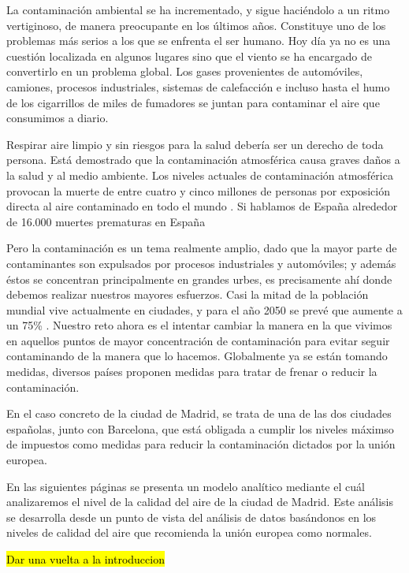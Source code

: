
La contaminación ambiental se ha incrementado, y sigue haciéndolo a un ritmo vertiginoso, de manera preocupante en los últimos años. Constituye uno de los problemas más serios a los que se enfrenta el ser humano. Hoy día ya no es una cuestión localizada en algunos lugares sino que el viento se ha encargado de convertirlo en un problema global. Los gases provenientes de automóviles, camiones, procesos industriales, sistemas de calefacción e incluso hasta el humo de los cigarrillos de miles de fumadores se juntan para contaminar el aire que consumimos a diario. 

Respirar aire limpio y sin riesgos para la salud debería ser un derecho de toda persona. Está demostrado que la contaminación atmosférica causa graves daños a la salud y al medio ambiente. Los niveles actuales de contaminación atmosférica provocan la muerte de entre cuatro y cinco millones de personas por exposición directa al aire contaminado en todo el mundo \cite{sharma_anirudh_anirudh_2018}. Si hablamos de España alrededor de 16.000 muertes prematuras en España \cite{informe_EeA_2019}

Pero la contaminación es un tema realmente amplio, dado que la mayor parte de contaminantes son expulsados por procesos industriales y automóviles; y además éstos se concentran principalmente en grandes urbes, es precisamente ahí donde debemos realizar nuestros mayores esfuerzos. Casi la mitad de la población mundial vive actualmente en ciudades, y para el año 2050 se prevé que aumente a un 75\% \cite{bbc_ciudades}. Nuestro reto ahora es el intentar cambiar la manera en la que vivimos en aquellos puntos de mayor concentración de contaminación para evitar seguir contaminando de la manera que lo hacemos. Globalmente ya se están tomando medidas, diversos países proponen medidas para tratar de frenar o reducir la contaminación. 

En el caso concreto de la ciudad de Madrid, se trata de una de las dos ciudades españolas, junto con Barcelona, que está obligada a cumplir los niveles máximso de  impuestos como medidas para reducir la contaminación dictados por la unión europea.

En las siguientes páginas se presenta un modelo analítico mediante el cuál analizaremos el nivel de la calidad del aire de la ciudad de Madrid. Este análisis se desarrolla desde un punto de vista del análisis de datos basándonos en los niveles de calidad del aire que recomienda la unión europea como normales.

 \hl{Dar una vuelta a la introduccion}